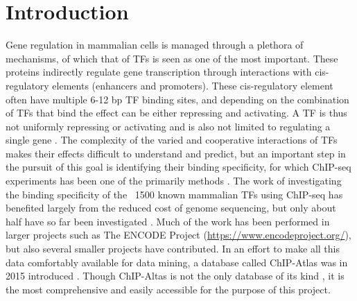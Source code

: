 \chapter{Introduction}
\vspace{-0.75cm}
Gene regulation in mammalian cells is managed through a plethora of mechanisms, of which that of \acp{TF} is seen as one of the most important. These proteins indirectly regulate gene transcription through interactions with cis-regulatory elements (enhancers and promoters). These cis-regulatory element often have multiple 6-12 bp \ac{TF} binding sites, and  depending on the combination of \acp{TF} that bind the effect can be either repressing and activating. A \ac{TF} is thus not uniformly repressing or activating and is also not limited to regulating a single gene \cite{Spitz2012, lambert2018}. The complexity of the varied and cooperative interactions of \acp{TF} makes their effects difficult to understand and predict, but an important step in the pursuit of this goal is identifying their binding specificity, for which \ac{ChIP-seq} experiments has been one of the primarily methods \cite{lambert2018}. The work of investigating the binding specificity of the ~1500 known mammalian \acp{TF} using \ac{ChIP-seq} has benefited largely from the reduced cost of genome sequencing, but only about half have so far been investigated \cite{ISMARA2014}. Much of the work has been performed in larger projects such as The ENCODE Project (\url{https://www.encodeproject.org/}), but also several smaller projects have contributed. In an effort to make all this data comfortably available for data mining, a database called ChIP-Atlas was in 2015 introduced \cite{Oki2018}. Though ChIP-Altas is not the only database of its kind \cite{fornes2020jaspar,zheng2019cistrome, sloan2016encode, czipa2020chipsummitdb}, it is the most comprehensive and easily accessible for the purpose of this project.

